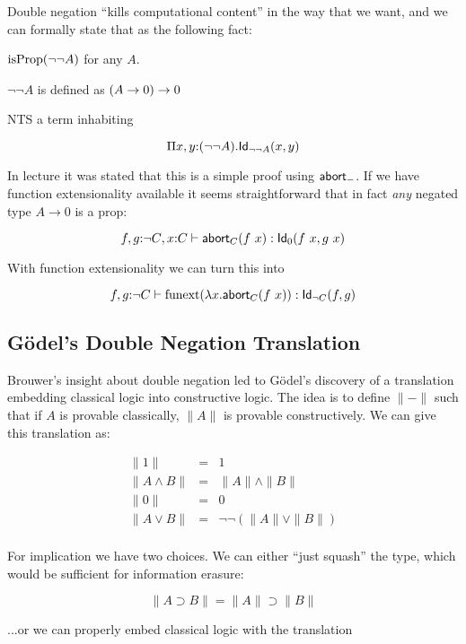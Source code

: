 \documentclass[11pt]{article}
\begin{document}
Double negation ``kills computational content'' in the way that we want,
and we can formally state that as the following fact:

$\operatorname{isProp}(\lnot\lnot A)$ for any $A$.

$\lnot\lnot A$ is defined as $(A\to 0) \to 0$

NTS a term inhabiting

\[
\Pi{x,y}{:}(\lnot\lnot A).\mathsf{Id}_{\lnot\lnot A}(x,y)
\]

In lecture it was stated that this is a simple proof using $\mathsf{abort}_{-}$. If we
have function extensionality available it seems straightforward that in
fact {\em any} negated type $A \to 0$ is a prop:

\[
{f,g}{:}{\lnot C}, x{:}C \vdash \mathsf{abort}_{C}(f\ x)
 : \mathsf{Id}_{0}(f\ x, g\ x)
\]

With function extensionality we can turn this into

\[
{f,g}{:}{\lnot C} \vdash \operatorname{funext}(\lambda{x}.\mathsf{abort}_{C}(f\ x))
 : \mathsf{Id}_{\lnot C}(f, g)
\]


\subsection{G{\"o}del's Double Negation Translation}
\newcommand{\dnt}[1]{{\parallel}{#1}{\parallel}}
\renewcommand{\implies}{\supset}

Brouwer's insight about double negation led to G{\"o}del's discovery of a
translation embedding classical logic into constructive logic.  The idea is
to define $\dnt{-}$ such that if $A$ is provable classically, $\dnt{A}$ is
provable constructively. We can give this translation as:

\begin{eqnarray*}
\dnt{1}           &=& 1\\
\dnt{A\land B}    &=& \dnt{A} \land \dnt{B}\\
\dnt{0}           &=& 0\\
\dnt{A\lor B}     &=& \lnot\lnot(\dnt{A} \lor \dnt{B})\\
\end{eqnarray*}

For implication we have two choices. We can either ``just squash'' the
type, which would be sufficient for information erasure:

\[
\dnt{A\implies B} = \dnt{A} \implies \dnt{B}
\]

...or we can properly embed classical logic with the translation
\end{document}
